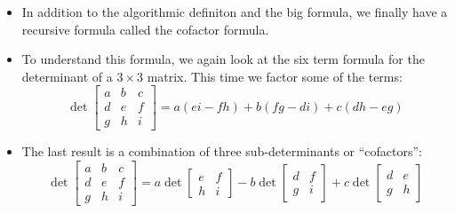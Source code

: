 \documentclass[11pt,oneside]{amsbook}
\theoremstyle{definition}
\theoremstyle{plain}
\theoremstyle{definition}
\theoremstyle{remark}
\numberwithin{equation}{section}
\numberwithin{figure}{section}
\begin{document}
\begin{itemize}
\[    +\begin{bmatrix}&b\\&&f\\g\\\end{bmatrix}
    +\begin{bmatrix}&&c\\d\\&h\\\end{bmatrix}
    -\begin{bmatrix}a\\&&f\\&h\\\end{bmatrix}
    -\begin{bmatrix}&b\\d\\&&i\\\end{bmatrix}
    -\begin{bmatrix}&&c\\&e\\g\\\end{bmatrix}
  \]
\item In addition to the algorithmic definiton and the big formula, we finally have a recursive formula called the cofactor formula.
\item To understand this formula, we again look at the six term formula for the determinant of a $3\times3$ matrix. This time we factor some of the terms:
  \[\det\begin{bmatrix}a&b&c\\d&e&f\\g&h&i\end{bmatrix}
    =a(ei-fh)+b(fg-di)+c(dh-eg)
  \]
\item The last result is a combination of three sub-determinants or ``cofactors'':
  \[\det\begin{bmatrix}a&b&c\\d&e&f\\g&h&i\end{bmatrix}
    =a\det\begin{bmatrix}e&f\\h&i\end{bmatrix}
    -b\det\begin{bmatrix}d&f\\g&i\end{bmatrix}
    +c\det\begin{bmatrix}d&e\\g&h\end{bmatrix}
\]
\end{itemize}
\end{document}
